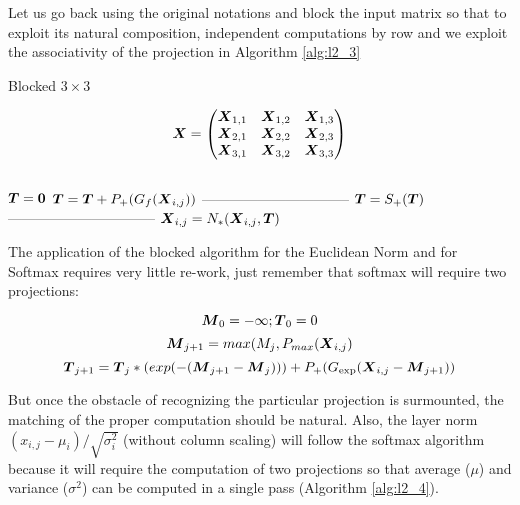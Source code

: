 \documentclass[acmsmall]{acmart}
\begin{document}
Let us go back using the original notations and block the input matrix
so that to exploit its natural composition, independent computations
by row and we exploit the associativity of the projection in Algorithm \ref{alg:l2_3}

\begin{algorithm}
    \caption{Blocked $3\times 3$}
    \label{alg:l2_3}
    \begin{algorithmic}
      \STATE \[
        {\boldsymbol X}  =   \begin{pmatrix}
          {\boldsymbol X}_{1,1} &    {\boldsymbol X}_{1,2}&    {\boldsymbol X}_{1,3}  \\
          {\boldsymbol X}_{2,1} &    {\boldsymbol X}_{2,2}&    {\boldsymbol X}_{2,3}  \\
          {\boldsymbol X}_{3,1} &    {\boldsymbol X}_{3,2}&    {\boldsymbol X}_{3,3}  \\
        \end{pmatrix}
      \] \\
          \STATE ${\boldsymbol T} = {\boldsymbol 0} $  
              \STATE ${\boldsymbol T} = {\boldsymbol T} +P_+(G_{f}({\boldsymbol X}_{i,j}))$   
          \ENDWHILE
          \STATE --------------------------------     
          \STATE ${\boldsymbol T}  =   S_+({\boldsymbol T})$       
          \STATE --------------------------------     
             \STATE $ {\boldsymbol X}_{i,j} = N_*({\boldsymbol X}_{i,j},{\boldsymbol T})$  
          \ENDWHILE
      \ENDWHILE
    \end{algorithmic}
\end{algorithm}

The application of the blocked algorithm for the Euclidean Norm and
for Softmax requires very little re-work, just remember that softmax
will require two projections:

\begin{equation} {\boldsymbol M}_0 = -\infty; {\boldsymbol T}_0 = 0 \end{equation}
\begin{equation} {\boldsymbol M}_{j+1} = max(M_j, P_{max}({\boldsymbol X}_{i,j}) \end{equation}
\begin{equation} {\boldsymbol T}_{j+1} = {\boldsymbol T}_j*(exp(-({\boldsymbol M}_{j+1}-{\boldsymbol M}_j))) + P_+(G_{\exp}({\boldsymbol X}_{i,j}-{\boldsymbol M}_{j+1})) \end{equation}

But once the obstacle of recognizing the particular projection is
surmounted, the matching of the proper computation should be
natural. Also, the layer norm $(x_{i,j} - \mu_i)/\sqrt{\sigma^2_i}$
(without column scaling) will follow the softmax algorithm because it
will require the computation of two projections so that average
($\mu$) and variance ($\sigma^2$) can be computed in a single pass (Algorithm \ref{alg:l2_4}).
\end{document}
